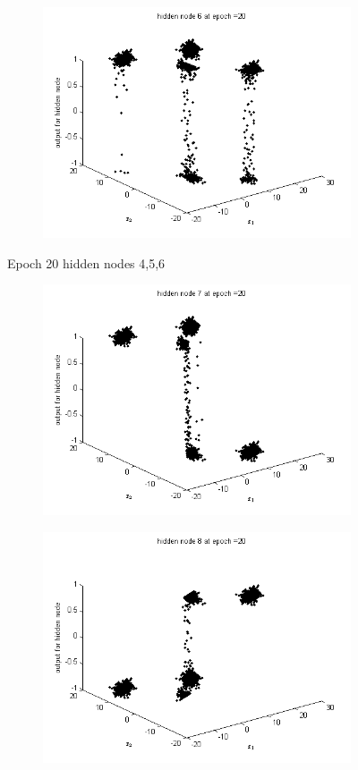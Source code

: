 \documentclass{article}
\begin{document}
\begin{flushleft}
\begin{figure}
\begin{subfigure}{.3\textwidth}
\end{subfigure}
\begin{subfigure}{.3\textwidth}
  \centering
  \includegraphics[width=.8\linewidth]{Classification/linearlySeparable/h20_6}
  
\end{subfigure}
\caption{Epoch 20 hidden nodes 4,5,6}
\end{figure}

\begin{figure}
\begin{subfigure}{.3\textwidth}
  \centering
  \includegraphics[width=.8\linewidth]{Classification/linearlySeparable/h20_7}
 
\end{subfigure}%
\begin{subfigure}{.3\textwidth}
  \centering
  \includegraphics[width=.8\linewidth]{Classification/linearlySeparable/h20_8}
  

\end{subfigure}
\end{figure}
\end{flushleft}
\end{document}
